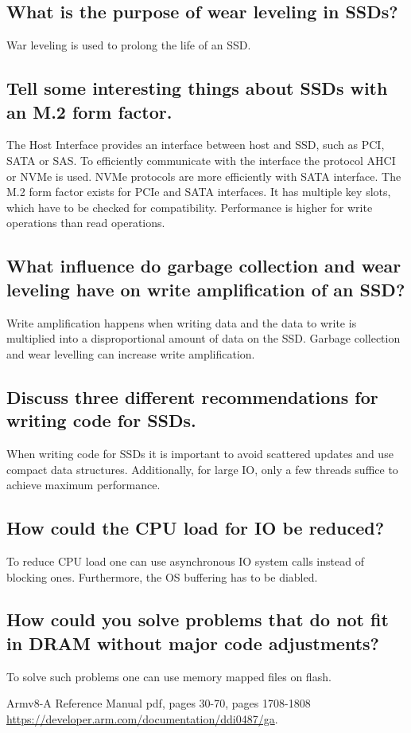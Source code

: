 \documentclass[runningheads]{llncs}
\begin{document}
\subsection{What is the purpose of wear leveling in SSDs?}
War leveling is used to prolong the life of an SSD.

\subsection{Tell some interesting things about SSDs with an M.2 form factor.}
The Host Interface provides an interface between host and SSD, such as PCI, SATA or SAS.
To efficiently communicate with the interface the protocol AHCI or NVMe is used.
NVMe protocols are more efficiently with SATA interface.
The M.2 form factor exists for PCIe and SATA interfaces.
It has multiple key slots, which have to be checked for compatibility.
Performance is higher for write operations than read operations.


\subsection{What influence do garbage collection and wear leveling have on write amplification of an SSD?}
Write amplification happens when writing data and the data to write is multiplied into a disproportional amount of data on the SSD.
Garbage collection and wear levelling can increase write amplification.

\subsection{Discuss three different recommendations for writing code for SSDs.}
When writing code for SSDs it is important to avoid scattered updates and use compact data structures.
Additionally, for large IO, only a few threads suffice to achieve maximum performance.

\subsection{How could the CPU load for IO be reduced?}
To reduce CPU load one can use asynchronous IO system calls instead of blocking ones.
Furthermore, the OS buffering has to be diabled.

\subsection{How could you solve problems that do not fit in DRAM without major code adjustments?}
To solve such problems one can use memory mapped files on flash.

%
%
%
% 
% 
%
\begin{thebibliography}{8}

Armv8-A Reference Manual pdf, pages 30-70, pages 1708-1808 \\ \url{https://developer.arm.com/documentation/ddi0487/ga}.

\end{thebibliography}
\end{document}
